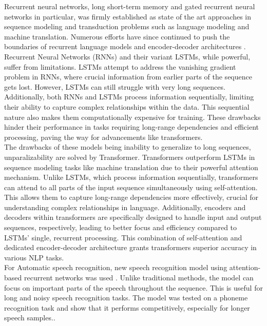  Recurrent neural networks, long short-term memory and gated recurrent neural networks in particular, was firmly established as state of the art approaches in sequence modeling and transduction problems such as language modeling and machine translation. Numerous efforts have since continued to push the boundaries of recurrent language models and encoder-decoder architectures \cite{vaswani2017attention}. Recurrent Neural Networks (RNNs) and their variant LSTMs, while powerful, suffer from limitations. LSTMs attempt to address the vanishing gradient problem in RNNs, where crucial information from earlier parts of the sequence gets lost. However, LSTMs can still struggle with very long sequences. Additionally, both RNNs and LSTMs process information sequentially, limiting their ability to capture complex relationships within the data. This sequential nature also makes them computationally expensive for training. These drawbacks hinder their performance in tasks requiring long-range dependencies and efficient processing, paving the way for advancements like transformers.\\
The drawbacks of these models being inability to generalize to long sequences, unparalizability are solved by Transformer. Transformers\cite{vaswani2017attention} outperform LSTMs in sequence modeling tasks like machine translation due to their powerful attention mechanism. Unlike LSTMs, which process information sequentially, transformers can attend to all parts of the input sequence simultaneously using self-attention. This allows them to capture long-range dependencies more effectively, crucial for understanding complex relationships in language. Additionally, encoders and decoders within transformers are specifically designed to handle input and output sequences, respectively, leading to better focus and efficiency compared to LSTMs' single, recurrent processing. This combination of self-attention and dedicated encoder-decoder architecture grants transformers superior accuracy in various NLP tasks. \\

For Automatic speech recognition, new speech recognition model using attention-based recurrent networks was used \cite{chorowski2015attention}. Unlike traditional methods, the model can focus on important parts of the speech throughout the sequence. This is useful for long and noisy speech recognition tasks. The model was tested  on a phoneme recognition task and show that it performs competitively, especially for longer speech samples.\cite{chorowski2015attention}. \newline

